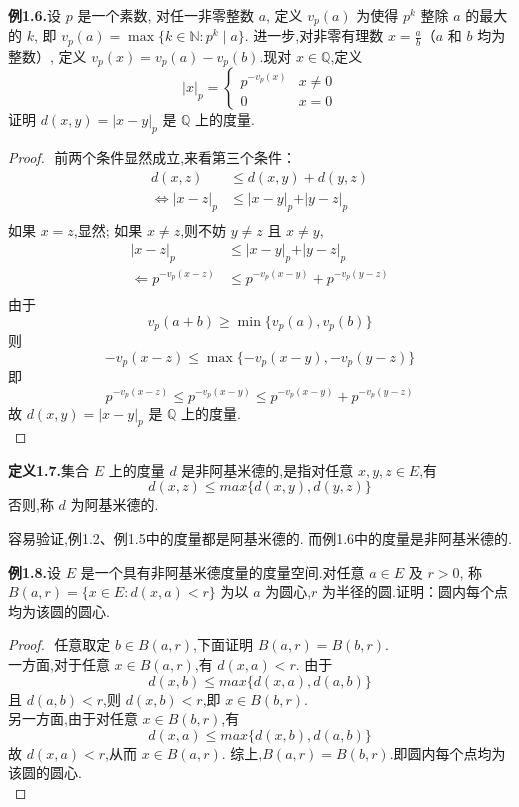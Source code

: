 \documentclass{article}
\begin{document}
\textbf{例1.6.}设 $p$ 是一个素数,
对任一非零整数 $a$,
定义 $v_p(a)$ 为使得 $p^k$ 整除 $a$ 的最大的 $k$,
即 $v_p(a) = \max\{k\in\mathbb{N}: p^k\mid a\}$.
进一步,对非零有理数 $x = \frac{a}{b}$（$a$ 和 $b$ 均为整数）,
定义 $v_p(x) = v_p(a) - v_p(b)$.现对 $x\in\mathbb{Q}$,定义
$$\vert x\vert_p = \begin{cases} p^{-v_p(x)} & x\neq 0 \\ 0 & x=0 \end{cases}$$
证明 $d(x,y) = \vert x-y\vert_p$ 是 $\mathbb{Q}$ 上的度量.

\begin{proof}
    $ $
    前两个条件显然成立,来看第三个条件：
    \begin{align*}
        d(x,z) &\leq d(x,y) + d(y,z) \\
        \iff \vert x-z\vert_p &\leq \vert x-y\vert_p + \vert y-z\vert_p \\
    \end{align*}
    如果 $x= z$,显然;
    如果 $x\neq z$,则不妨 $y\neq z$ 且 $x\neq y$,
    \begin{align*}
        \vert x-z\vert_p &\leq \vert x-y\vert_p + \vert y-z\vert_p \\
        \Longleftarrow p^{-v_p(x-z)} &\leq p^{-v_p(x-y)} + p^{-v_p(y-z)} \\
    \end{align*}
    由于
    \[v_p(a+b)\geq \min\{v_p(a),v_p(b)\}\]
    则
    \[-v_p(x-z)\leq \max\{-v_p(x-y),-v_p(y-z)\}\]
    即
    \[p^{-v_p(x-z)}\leq p^{-v_p(x-y)} \leq p^{-v_p(x-y)} + p^{-v_p(y-z)}\]
    故 $d(x,y) = \vert x-y\vert_p$ 是 $\mathbb{Q}$ 上的度量.\\
\end{proof}

\textbf{定义1.7.}集合 $E$ 上的度量 $d$ 是非阿基米德的,是指对任意 $x,y,z\in E$,有
$$d(x,z) \leq max\{d(x,y),d(y,z)\}$$
否则,称 $d$ 为阿基米德的.

容易验证,例1.2、例1.5中的度量都是阿基米德的.
而例1.6中的度量是非阿基米德的.

\textbf{例1.8.}设 $E$ 是一个具有非阿基米德度量的度量空间.对任意 $a\in E$ 及 $r>0$,
称 $B(a,r) = \{x\in E: d(x,a)<r\}$ 为以 $a$ 为圆心,$r$ 为半径的圆.证明：圆内每个点均为该圆的圆心.
\begin{proof}
    $ $
    任意取定 $b\in B(a,r)$,下面证明 $B(a,r) = B(b,r)$.\\
    一方面,对于任意 $x\in B(a,r)$,有 $d(x,a)<r$.
    由于
    \[d(x,b)\leq max\{d(x,a),d(a,b)\}\]
    且 $d(a,b)<r$,则 $d(x,b) < r$,即 $x\in B(b,r)$.\\
    另一方面,由于对任意 $x\in B(b,r)$,有
    \[d(x,a) \leq max\{d(x,b),d(a,b)\}\]
    故 $d(x,a) < r$,从而 $x\in B(a,r)$.
    综上,$B(a,r) = B(b,r)$.即圆内每个点均为该圆的圆心.\\
\end{proof}
\end{document}
